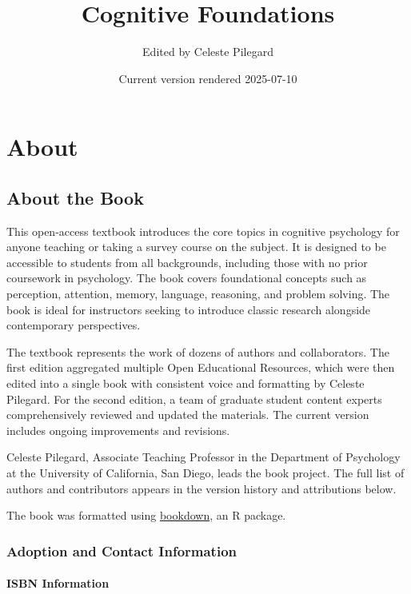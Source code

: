 \documentclass[
]{krantz}
\title{Cognitive Foundations}
\author{Edited by Celeste Pilegard}
\date{Current version rendered 2025-07-10}
\makeatletter
\newcommand*\pandocbounded[1]{%
  \sbox\pandoc@box{#1}%
  \Gscale@div\@tempa{\textheight}{\dimexpr\ht\pandoc@box+\dp\pandoc@box\relax}%
  \Gscale@div\@tempb{\linewidth}{\wd\pandoc@box}%
  \ifdim\@tempb\p@<\@tempa\p@\let\@tempa\@tempb\fi%
  \ifdim\@tempa\p@<\p@\scalebox{\@tempa}{\usebox\pandoc@box}%
  \else\usebox{\pandoc@box}%
  \fi%
}
\makeatother
\begin{document}
\maketitle

{
\setcounter{tocdepth}{1}
\tableofcontents
}
\chapter*{About}\label{about}


\pandocbounded{\texttt{[image: images/cover.png]}}

\section*{About the Book}\label{about-the-book}


This open-access textbook introduces the core topics in cognitive psychology for anyone teaching or taking a survey course on the subject. It is designed to be accessible to students from all backgrounds, including those with no prior coursework in psychology. The book covers foundational concepts such as perception, attention, memory, language, reasoning, and problem solving. The book is ideal for instructors seeking to introduce classic research alongside contemporary perspectives.

The textbook represents the work of dozens of authors and collaborators. The first edition aggregated multiple Open Educational Resources, which were then edited into a single book with consistent voice and formatting by Celeste Pilegard. For the second edition, a team of graduate student content experts comprehensively reviewed and updated the materials. The current version includes ongoing improvements and revisions.

Celeste Pilegard, Associate Teaching Professor in the Department of Psychology at the University of California, San Diego, leads the book project. The full list of authors and contributors appears in the version history and attributions below.

The book was formatted using \href{https://bookdown.org/}{bookdown}, an R package.

\subsection*{Adoption and Contact Information}\label{adoption-and-contact-information}


\subsubsection*{ISBN Information}\label{isbn-information}
\end{document}
